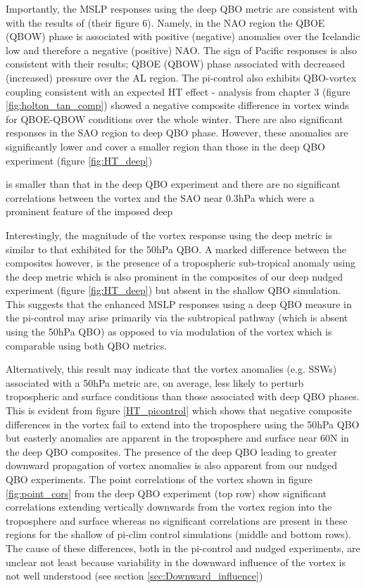 Importantly, the MSLP responses using the deep QBO metric are consistent with with the results of \cite{andrewsObserved2019d} (their figure 6). Namely, in the NAO region the QBOE (QBOW) phase is associated with positive (negative) anomalies over the Icelandic low and therefore a negative (positive) NAO. The sign of Pacific responses is also consistent with their results; QBOE (QBOW) phase associated with decreased (increased) pressure over the AL region. The pi-control also exhibits QBO-vortex coupling consistent with an expected HT effect - analysis from chapter 3 (figure \ref{fig:holton_tan_comp}) showed a negative composite difference in vortex winds for QBOE-QBOW conditions over the whole winter. There are also significant responses in the SAO region to deep QBO phase. However, these anomalies are significantly lower and cover a smaller region than those in the deep QBO experiment (figure \ref{fig:HT_deep})

is smaller than that in the deep QBO experiment and there are no significant correlations between the vortex and the SAO near 0.3hPa which were a prominent feature of the imposed deep

Interestingly, the magnitude of the vortex response using the deep metric is similar to that exhibited for the 50hPa QBO. A marked difference between the composites however, is the presence of a tropospheric sub-tropical anomaly using the deep metric which is also prominent in the composites of our deep nudged experiment (figure \ref{fig:HT_deep}) but absent in the shallow QBO simulation. This suggests that the enhanced MSLP responses using a deep QBO measure in the pi-control may arise primarily via the subtropical pathway (which is absent using the 50hPa QBO) as opposed to via modulation of the vortex which is comparable using both QBO metrics. 

Alternatively, this result may indicate that the vortex anomalies (e.g. SSWs) associated with a 50hPa metric are, on average, less likely to perturb tropospheric and surface conditions than those associated with deep QBO phases. This is evident from figure \ref{HT_picontrol} which shows that negative composite differences in the vortex fail to extend into the troposphere using the 50hPa QBO but easterly anomalies are apparent in the troposphere and surface near 60N in the deep QBO composites. The presence of the deep QBO leading to greater downward propagation of vortex anomalies is also apparent from our nudged QBO experiments. The point correlations of the vortex shown in figure \ref{fig:point_cors} from the deep QBO experiment (top row) show significant correlations extending vertically downwards from the vortex region into the troposphere and surface whereas no significant correlations are present in these regions for the shallow of pi-clim control simulations (middle and bottom rows). The cause of these differences, both in the pi-control and nudged experiments, are unclear not least because variability in the downward influence of the vortex is not well understood (see section \ref{sec:Downward_influence}) 

